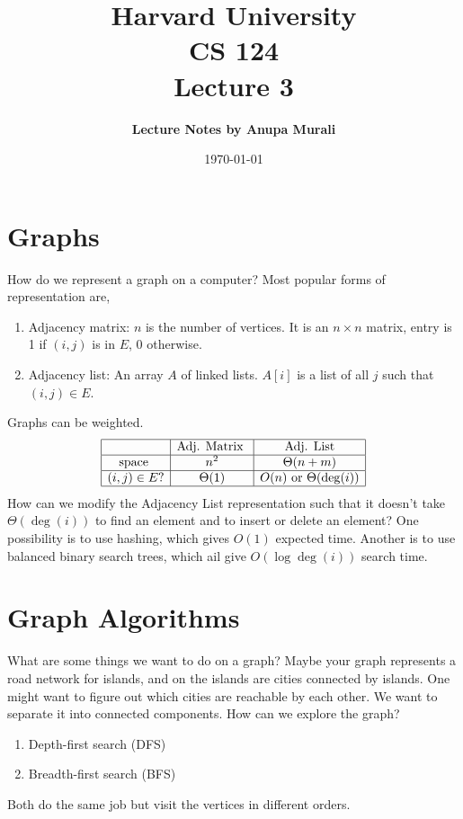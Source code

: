 \documentclass[12pt]{article}   	%
\title{\bf \large Harvard University\\ CS 124\\ \vspace{0.15in} Lecture 3}
\author{ \bf \large Lecture Notes by  Anupa Murali}
\date{\today}
\begin{document}
\maketitle
\section{Graphs}
How do we represent a graph on a computer? Most popular forms of representation are,
\begin{enumerate}
\item Adjacency matrix: $n$ is the number of vertices. It is an $n\times n$ matrix, entry is 1 if $(i,j)$ is in $E$, 0 otherwise.
\item Adjacency list: An array $A$ of linked lists. $A[i]$ is a list of all $j$ such that $(i,j) \in E$.
\end{enumerate}
Graphs can be weighted. 
$$
\begin{array}{|c|c|c|}
\hline
 & \text{Adj. Matrix } & \text{ Adj. List }\\
 \hline
\text{space } & n^2 & \Theta(n+m)\\
\hline
(i,j) \in E? & \Theta(1) & O(n) \text{ or } \Theta(\deg(i))\\
\hline
\end{array}
$$
How can we modify the Adjacency List representation such that it doesn't take $\Theta(\deg(i))$ to find an element and to insert or delete an element? One possibility is to use hashing, which gives $O(1)$ expected time. Another is to use balanced binary search trees, which ail give $O(\log \deg(i))$ search time. \\

\section{Graph Algorithms}
What are some things we want to do on a graph? Maybe your graph represents a road network for islands, and on the islands are cities connected by islands. One might want to figure out which cities are reachable by each other. We want to separate it into connected components. How can we explore the graph?
\begin{enumerate}
\item Depth-first search (DFS)
\item Breadth-first search (BFS)
\end{enumerate}
Both do the same job but visit the vertices in different orders. 
\end{document}
